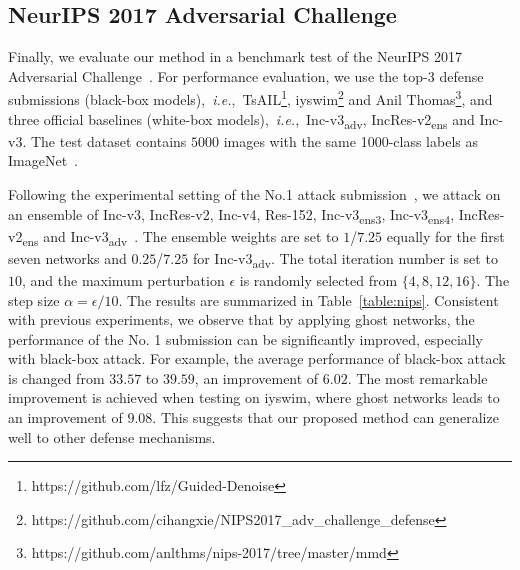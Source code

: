 \documentclass[letterpaper]{article} %
\def\ie{\emph{i.e.}}
\begin{document}
\subsection{NeurIPS 2017 Adversarial Challenge} \label{sec: nipsExp}
Finally, we evaluate our method in a benchmark test of the NeurIPS 2017 Adversarial Challenge~\cite{kurakin2018adversarial}. For performance evaluation, we use the top-3 defense submissions (black-box models),~\ie,~TsAIL\footnote{https://github.com/lfz/Guided-Denoise}, iyswim\footnote{https://github.com/cihangxie/NIPS2017\_adv\_challenge\_defense} and Anil Thomas\footnote{https://github.com/anlthms/nips-2017/tree/master/mmd}, and three official baselines (white-box models),~\ie,~Inc-v3\textsubscript{adv}, IncRes-v2\textsubscript{ens} and Inc-v3. The test dataset contains $5000$ images with the same 1000-class labels as ImageNet~\cite{deng2009imagenet}.

Following the experimental setting of the No.1 attack submission~\cite{dong2017boosting}, we attack on an ensemble of Inc-v3, IncRes-v2, Inc-v4, Res-152, Inc-v3\textsubscript{ens3}, Inc-v3\textsubscript{ens4}, IncRes-v2\textsubscript{ens} and Inc-v3\textsubscript{adv}~\cite{kurakin2016scale}. The ensemble weights are set to $1$/$7.25$ equally for the first seven networks and $0.25$/$7.25$ for Inc-v3\textsubscript{adv}. The total iteration number is set to $10$, and the maximum perturbation $\epsilon$ is randomly selected from $\{4, 8, 12, 16\}$. The step size $\alpha = \epsilon/10$.
The results are summarized in Table~\ref{table:nips}. Consistent with previous experiments, we observe that by applying ghost networks, the performance of the No. 1 submission can be significantly improved, especially with black-box attack.
For example, the average performance of black-box attack is changed from $33.57$ to $39.59$, an improvement of $6.02$. The most remarkable improvement is achieved when testing on iyswim, where ghost networks leads to an improvement of $9.08$. 
This suggests that our proposed method can generalize well to other defense mechanisms.
\end{document}
